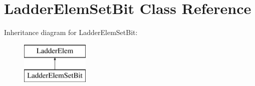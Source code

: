 \hypertarget{class_ladder_elem_set_bit}{\section{Ladder\-Elem\-Set\-Bit Class Reference}
\label{class_ladder_elem_set_bit}
}
Inheritance diagram for Ladder\-Elem\-Set\-Bit\-:\begin{figure}[H]
\begin{center}
\leavevmode
\includegraphics[height=2.000000cm]{class_ladder_elem_set_bit}
\end{center}
\end{figure}
